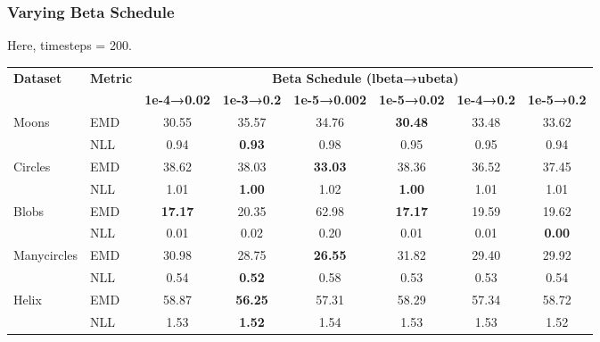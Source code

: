 \documentclass[11pt]{article}
\begin{document}
\subsubsection{Varying Beta Schedule}
Here, timesteps = 200.

\begin{longtable}{|l|l|c|c|c|c|c|c|}
    \hline
     \textbf{Dataset} & \textbf{Metric} & \multicolumn{6}{c|}{\textbf{Beta Schedule (lbeta→ubeta)}} \\
     \cline{3-8}
     & & \textbf{1e-4→0.02} & \textbf{1e-3→0.2} & \textbf{1e-5→0.002} & \textbf{1e-5→0.02} & \textbf{1e-4→0.2} & \textbf{1e-5→0.2} \\
    \hline
        \multirow{2}{*}{Moons} & EMD & 30.55 & 35.57 & 34.76 & \textbf{30.48} & 33.48 & 33.62 \\
        \cline{2-8}
        & NLL & 0.94 & \textbf{0.93} & 0.98 & 0.95 & 0.95 & 0.94 \\
        \hline
        \multirow{2}{*}{Circles} & EMD & 38.62 & 38.03 & \textbf{33.03} & 38.36 & 36.52 & 37.45 \\
        \cline{2-8}
        & NLL & 1.01 & \textbf{1.00} & 1.02 & \textbf{1.00} & 1.01 & 1.01 \\
        \hline
        \multirow{2}{*}{Blobs} & EMD & \textbf{17.17} & 20.35 & 62.98 & \textbf{17.17} & 19.59 & 19.62 \\
        \cline{2-8}
        & NLL & 0.01 & 0.02 & 0.20 & 0.01 & 0.01 & \textbf{0.00} \\
        \hline
        \multirow{2}{*}{Manycircles} & EMD & 30.98 & 28.75 & \textbf{26.55} & 31.82 & 29.40 & 29.92 \\
        \cline{2-8}
        & NLL & 0.54 & \textbf{0.52} & 0.58 & 0.53 & 0.53 & 0.54 \\
        \hline
        \multirow{2}{*}{Helix} & EMD & 58.87 & \textbf{56.25} & 57.31 & 58.29 & 57.34 & 58.72 \\
        \cline{2-8}
        & NLL & 1.53 & \textbf{1.52} & 1.54 & 1.53 & 1.53 & 1.52 \\
        \hline
    \end{longtable}
\end{document}
